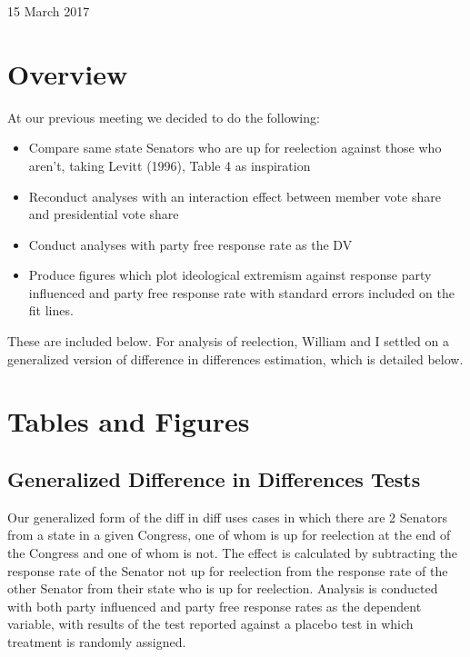 \documentclass[12pt]{article}
\begin{document}
	
\begin{center}
	\Large 15 March 2017
\end{center}

\section{Overview}

At our previous meeting we decided to do the following:

\begin{itemize}
	\item Compare same state Senators who are up for reelection against those who aren't, taking Levitt (1996), Table 4 as inspiration
	
	\item Reconduct analyses with an interaction effect between member vote share and presidential vote share
	
	\item Conduct analyses with party free response rate as the DV
	
	\item Produce figures which plot ideological extremism against response party influenced and party free response rate with standard errors included on the fit lines.
\end{itemize}

\noindent
These are included below. For analysis of reelection, William and I settled on a generalized version of difference in differences estimation, which is detailed below.

\section{Tables and Figures}

\subsection{Generalized Difference in Differences Tests}

Our generalized form of the diff in diff uses cases in which there are 2 Senators from a state in a given Congress, one of whom is up for reelection at the end of the Congress and one of whom is not. The effect is calculated by subtracting the response rate of the Senator not up for reelection from the response rate of the other Senator from their state who is up for reelection. Analysis is conducted with both party influenced and party free response rates as the dependent variable, with results of the test reported against a placebo test in which treatment is randomly assigned.
\end{document}
